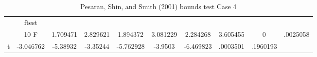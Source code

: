 \begin{table}[htbp]\centering
\caption{Pesaran, Shin, and Smith (2001) bounds test Case 4 \label{tab:model4ln-bounds}}
\begin{tabular}{l*{8}{c}}
\toprule
            &       ftest&            &            &            &            &            &            &            \\
            &    10%
\midrule
F           &    1.709471&    2.829621&    1.894372&    3.081229&    2.284268&    3.605455&           0&    .0025058\\
t           &   -3.046762&    -5.38932&    -3.35244&   -5.762928&     -3.9503&   -6.469823&    .0003501&    .1960193\\
\bottomrule
\end{tabular}
\end{table}
